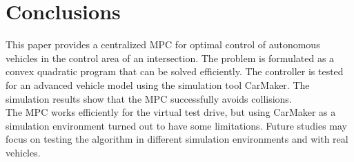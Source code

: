 \documentclass[letterpaper,10pt,conference]{ieeeconf}
\begin{document}
\section{Conclusions} \label{sec:conclusions}
This paper provides a centralized MPC for optimal control of autonomous vehicles in the control area of an intersection. The problem is formulated as a convex quadratic program that can be solved efficiently. The controller is tested for an advanced vehicle model using the simulation tool CarMaker. The simulation results show that the MPC successfully avoids collisions.\\ \indent
The MPC works efficiently for the virtual test drive, but using CarMaker as a simulation environment turned out to have some limitations. Future studies may focus on testing the algorithm in different simulation environments and with real vehicles.
\end{document}
